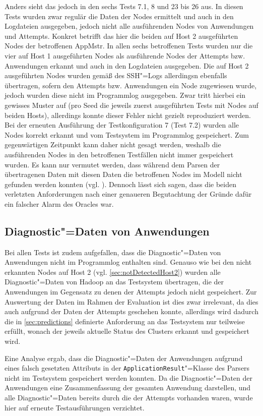 Anders sieht das jedoch in den sechs Tests 7.1, 8 und 23 bis 26 aus.
In diesen Tests wurden zwar regulär die Daten der Nodes ermittelt und auch in den Logdateien ausgegeben, jedoch nicht alle ausführenden Nodes von Anwendungen und Attempts.
Konkret betrifft das hier die beiden auf Host 2 ausgeführten Nodes der betroffenen \ac{AppMstr}.
In allen sechs betroffenen Tests wurden nur die vier auf Host 1 ausgeführten Nodes als ausführende Nodes der Attempts bzw. Anwendungen erkannt und auch in den Logdateien ausgegeben.
Die auf Host 2 ausgeführten Nodes wurden gemäß des SSH"=Logs allerdingsn ebenfalls übertragen, sofern den Attempts bzw. Anwendungen ein Node zugewiesen wurde, jedoch wurden diese nicht im Programmlog ausgegeben.
Zwar tritt hierbei ein gewisses Muster auf (pro Seed die jeweils zuerst ausgeführten Tests mit Nodes auf beiden Hosts), allerdings konnte dieser Fehler nicht gezielt reproduziert werden.
Bei der erneuten Ausführung der Testkonfiguration 7 (Test 7.2) wurden alle Nodes korrekt erkannt und vom Testsystem im Programmlog gespeichert.
Zum gegenwärtigen Zeitpunkt kann daher nicht gesagt werden, weshalb die ausführenden Nodes in den betroffenen Testfällen nicht immer gespeichert wurden.
Es kann nur vermutet werden, dass während dem Parsen der übertragenen Daten mit diesen Daten die betroffenen Nodes im Modell nicht gefunden werden konnten (vgl. ).
Dennoch lässt sich sagen, dass die beiden verletzten Anforderungen nach einer genaueren Begutachtung der Gründe dafür ein falscher Alarm des Oracles war.

\subsection{Diagnostic"=Daten von Anwendungen}
\label{sec:notSavedAppDiagnostics}

Bei allen Tests ist zudem aufgefallen, dass die Diagnostic"=Daten von Anwendungen nicht im Programmlog enthalten sind.
Genauso wie bei den nicht erkannten Nodes auf Host 2 (vgl. \autoref{sec:notDetectedHost2}) wurden alle Diagnostic"=Daten von Hadoop an das Testsystem übertragen, die der Anwendungen im Gegensatz zu denen der Attempts jedoch nicht gespeichert.
Zur Auswertung der Daten im Rahmen der Evaluation ist dies zwar irrelevant, da dies auch aufgrund der Daten der Attempts geschehen konnte, allerdings wird dadurch die in \autoref{sec:predictions} definierte Anforderung an das Testsystem nur teilweise erfüllt, wonach der jeweils aktuelle Status des Clusters erkannt und gespeichert wird.

Eine Analyse ergab, dass die Diagnostic"=Daten der Anwendungen aufgrund eines falsch gesetzten Attributs in der \texttt{ApplicationResult}"=Klasse des Parsers nicht im Testsystem gespeichert werden konnten. 
Da die Diagnostic"=Daten der Anwendungen eine Zusammenfassung der gesamten Anwendung darstellen, und alle Diagnostic"=Daten bereits durch die der Attempts vorhanden waren, wurde hier auf erneute Testausführungen verzichtet.

